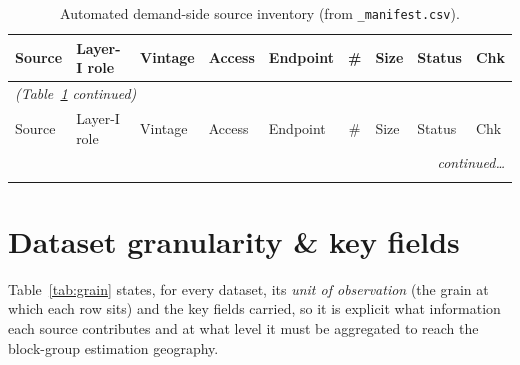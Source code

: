 \documentclass[11pt]{article}
\begin{document}
\begin{center}
\scriptsize
\setlength{\tabcolsep}{3pt}
\renewcommand{\arraystretch}{1.15}
\begin{longtable}{p{1.7cm} p{2.6cm} p{1.45cm} p{1.5cm} p{2.45cm} c p{1.05cm} p{1.55cm} p{0.7cm}}
\caption{Automated demand-side source inventory (from \texttt{\_manifest.csv}).}
\label{tab:inventory}\\
\toprule
Source & Layer-I role & Vintage & Access & Endpoint & \# & Size & Status & Chk\\
\midrule
\endfirsthead
\multicolumn{9}{l}{\emph{(Table~\ref{tab:inventory} continued)}}\\
\toprule
Source & Layer-I role & Vintage & Access & Endpoint & \# & Size & Status & Chk\\
\midrule
\endhead
\midrule
\multicolumn{9}{r}{\emph{continued\ldots}}\\
\endfoot
\bottomrule
\endlastfoot

\end{longtable}
\end{center}

\section{Dataset granularity \& key fields}
Table~\ref{tab:grain} states, for every dataset, its \emph{unit of observation}
(the grain at which each row sits) and the key fields carried, so it is explicit
what information each source contributes and at what level it must be aggregated
to reach the block-group estimation geography.
\end{document}
